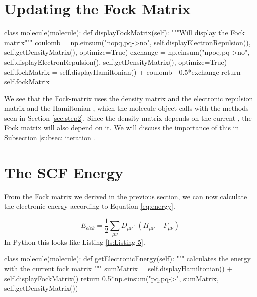 \section{Updating the Fock Matrix}
\label{sec:step4}


    
\begin{python}[caption={calculating the Fock matrix},label={ls:Listing 4}]
    class molecule(molecule):
        def displayFockMatrix(self):
            """Will display the Fock matrix"""
            coulomb = np.einsum("nopq,pq->no", 
                    self.displayElectronRepulsion(), 
                    self.getDensityMatrix(), optimize=True)
            exchange = np.einsum("npoq,pq->no", 
                    self.displayElectronRepulsion(), 
                    self.getDensityMatrix(), optimize=True)
            self.fockMatrix = self.displayHamiltonian() 
                            + coulomb - 0.5*exchange
            return self.fockMatrix
\end{python}
 
 
We see that the Fock-matrix uses the density matrix and the electronic 
repulsion matrix and the Hamiltonian , which the molecule object calls with the 
methods seen in Section \ref{sec:step2}. Since the density matrix depends on the 
current , the Fock matrix will also depend on it. 
We will discuss the importance of this in Subsection \ref{subsec: iteration}. 

 
 \section{The SCF Energy}
 \label{sec:step5}
 From the Fock matrix we derived in the previous section, we can now calculate 
 the electronic energy according to Equation \eqref{eq:energy}.
 
 \begin{equation} \label{eq:energy}
     E_{elek} = \frac{1}{2}\sum_{\mu\nu}D_{\mu\nu}\cdot(H_{\mu\nu} + F_{\mu\nu})
 \end{equation}
 In Python this looks like Listing \ref{ls:Listing 5}.
 
 
    
\begin{python}[caption={calculating the energy},label={ls:Listing 5}]
    class molecule(molecule):
        def getElectronicEnergy(self):
            """
            calculates the energy with the current fock matrix
            """
            sumMatrix = self.displayHamiltonian() 
                    + self.displayFockMatrix()
            return 0.5*np.einsum("pq,pq->", sumMatrix, 
                            self.getDensityMatrix())
\end{python}

